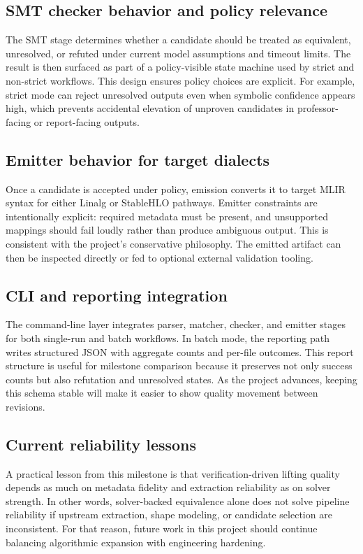 \documentclass[conference]{IEEEtran}
\begin{document}
\subsection{SMT checker behavior and policy relevance}
The SMT stage determines whether a candidate should be treated as equivalent, unresolved, or refuted under current model assumptions and timeout limits. The result is then surfaced as part of a policy-visible state machine used by strict and non-strict workflows. This design ensures policy choices are explicit. For example, strict mode can reject unresolved outputs even when symbolic confidence appears high, which prevents accidental elevation of unproven candidates in professor-facing or report-facing outputs.

\subsection{Emitter behavior for target dialects}
Once a candidate is accepted under policy, emission converts it to target MLIR syntax for either Linalg or StableHLO pathways. Emitter constraints are intentionally explicit: required metadata must be present, and unsupported mappings should fail loudly rather than produce ambiguous output. This is consistent with the project's conservative philosophy. The emitted artifact can then be inspected directly or fed to optional external validation tooling.

\subsection{CLI and reporting integration}
The command-line layer integrates parser, matcher, checker, and emitter stages for both single-run and batch workflows. In batch mode, the reporting path writes structured JSON with aggregate counts and per-file outcomes. This report structure is useful for milestone comparison because it preserves not only success counts but also refutation and unresolved states. As the project advances, keeping this schema stable will make it easier to show quality movement between revisions.

\subsection{Current reliability lessons}
A practical lesson from this milestone is that verification-driven lifting quality depends as much on metadata fidelity and extraction reliability as on solver strength. In other words, solver-backed equivalence alone does not solve pipeline reliability if upstream extraction, shape modeling, or candidate selection are inconsistent. For that reason, future work in this project should continue balancing algorithmic expansion with engineering hardening.
\end{document}
